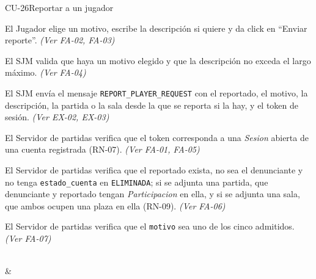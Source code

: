 \begin{fichacu}{CU-26}{Reportar a un jugador}
{\begin{cuenum}[start=1]
      \item El Jugador elige un motivo, escribe la descripción si quiere y da click en ``Enviar reporte''. \textit{(Ver \mbox{FA-02}, \mbox{FA-03})}
      \item El SJM valida que haya un motivo elegido y que la descripción no exceda el largo máximo. \textit{(Ver \mbox{FA-04})}
      \item El SJM envía el mensaje \texttt{REPORT\_\allowbreak{}PLAYER\_\allowbreak{}REQUEST} con el reportado, el motivo, la descripción, la partida o la sala desde la que se reporta si la hay, y el token de sesión. \textit{(Ver \mbox{EX-02}, \mbox{EX-03})}
      \item El Servidor de partidas verifica que el token corresponda a una \textit{Sesion} abierta de una cuenta registrada (\mbox{RN-07}). \textit{(Ver \mbox{FA-01}, \mbox{FA-05})}
      \item El Servidor de partidas verifica que el reportado exista, no sea el denunciante y no tenga \texttt{estado\_\allowbreak{}cuenta} en \texttt{ELIMINADA}; si se adjunta una partida, que denunciante y reportado tengan \textit{Participacion} en ella, y si se adjunta una sala, que ambos ocupen una plaza en ella (\mbox{RN-09}). \textit{(Ver \mbox{FA-06})}
      \item El Servidor de partidas verifica que el \texttt{motivo} sea uno de los cinco admitidos. \textit{(Ver \mbox{FA-07})}
    \end{cuenum}} \\
   & 
\end{fichacu}
